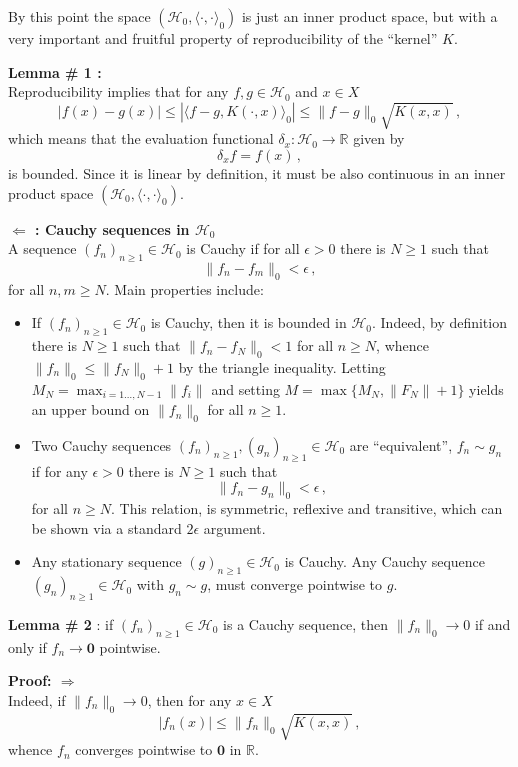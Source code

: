 \documentclass[a4paper]{article}
\newcommand{\Real}{\mathbb{R}}
\newcommand{\nil}{\mathbf{0}}
\newcommand{\Hcal}{\mathcal{H}}
\begin{document}
By this point the space $(\Hcal_0,\langle\cdot,\cdot\rangle_0)$ is just an inner
product space, but with a very important and fruitful property of reproducibility
of the ``kernel'' $K$.

\noindent\textbf{Lemma \# 1 : } \hfill \\
Reproducibility implies that for any $f,g\in\Hcal_0$ and $x\in X$
\[
| f(x) - g(x) |
\leq |\langle f-g,K(\cdot,x)\rangle_0|
\leq \|f-g\|_0 \sqrt{ K(x,x) }\,,
\]
which means that the evaluation functional $\delta_x:\Hcal_0\to\Real$ given by
\[ \delta_x f = f(x) \,,\]
is bounded. Since it is linear by definition, it must be also continuous in an inner
product space $(\Hcal_0,\langle\cdot,\cdot\rangle_0)$.

\noindent \textbf{ $\Leftarrow$ : Cauchy sequences in $\Hcal_0$}\hfill\\
A sequence $(f_n)_{n\geq1} \in \Hcal_0$ is Cauchy if for all $\epsilon>0$ there
is $N\geq1$ such that
\[ \|f_n - f_m\|_0 < \epsilon \,, \]
for all $n,m\geq N$. Main properties include: \begin{itemize}
	\item If $(f_n)_{n\geq1}\in \Hcal_0$ is Cauchy, then it is bounded in $\Hcal_0$.
		Indeed, by definition there is $N\geq 1$ such that $ \|f_n - f_N\|_0 < 1 $ for
		all $n\geq N$, whence $\|f_n\|_0 \leq \|f_N\|_0 + 1$ by the triangle inequality.
		Letting $M_N = \max_{i=1\ldots,N-1}\|f_i\|$ and setting $M = \max\{M_N, \|F_N\|+1\}$
		yields an upper bound on $\|f_n\|_0$ for all $n\geq1$.
	\item Two Cauchy sequences $(f_n)_{n\geq1},(g_n)_{n\geq1}\in \Hcal_0$ are ``equivalent'',
		$f_n \sim g_n$ if for any $\epsilon>0$ there is $N\geq 1$ such that
		\[ \| f_n - g_n \|_0 < \epsilon\,, \]
		for all $n\geq N$. This relation, is symmetric, reflexive and transitive,
		which can be shown via a standard $2\epsilon$ argument.
	\item Any stationary sequence $(g)_{n\geq1}\in \Hcal_0$ is Cauchy. Any Cauchy
		sequence $(g_n)_{n\geq1}\in \Hcal_0$ with $g_n\sim g$, must converge
		pointwise to $g$.
\end{itemize}

\noindent\textbf{Lemma \# 2} : if $(f_n)_{n\geq1}\in \Hcal_0$ is a Cauchy sequence,
then $\|f_n\|_0 \to 0$ if and only if $f_n\to\nil$ pointwise.

\noindent\textbf{Proof: $\Rightarrow$} \hfill\\
Indeed, if $\|f_n\|_0 \to 0$, then for any $x\in X$
\[ |f_n(x)| \leq \|f_n\|_0 \sqrt{ K(x,x) }\,, \]
whence $f_n$ converges pointwise to $\nil$ in $\Real$.
\end{document}
